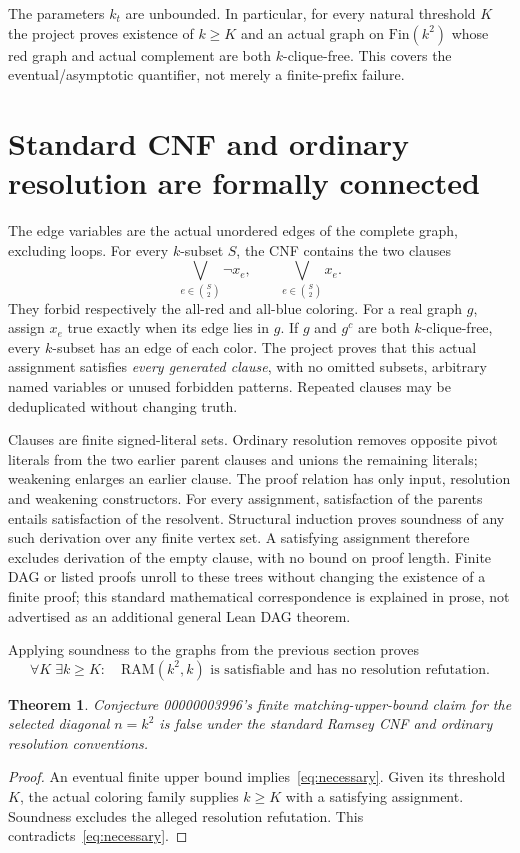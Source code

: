 \documentclass[10pt,a4paper]{article}
\newtheorem{theorem}{Theorem}
\begin{document}
The parameters $k_t$ are unbounded. In particular, for every natural threshold $K$ the
project proves existence of $k\ge K$ and an actual graph on $\mathrm{Fin}(k^2)$ whose red
graph and actual complement are both $k$-clique-free. This covers the eventual/asymptotic
quantifier, not merely a finite-prefix failure.

\section{Standard CNF and ordinary resolution are formally connected}
The edge variables are the actual unordered edges of the complete graph, excluding loops.
For every $k$-subset $S$, the CNF contains the two clauses
\[
 \bigvee_{e\in\binom S2}\neg x_e,\qquad
 \bigvee_{e\in\binom S2}x_e.
\]
They forbid respectively the all-red and all-blue coloring. For a real graph $g$, assign
$x_e$ true exactly when its edge lies in $g$. If $g$ and $g^c$ are both $k$-clique-free,
every $k$-subset has an edge of each color. The project proves that this actual assignment
satisfies \emph{every generated clause}, with no omitted subsets, arbitrary named variables
or unused forbidden patterns. Repeated clauses may be deduplicated without changing truth.

Clauses are finite signed-literal sets. Ordinary resolution removes opposite pivot literals
from the two earlier parent clauses and unions the remaining literals; weakening enlarges
an earlier clause. The proof relation has only input, resolution and weakening constructors.
For every assignment, satisfaction of the parents entails satisfaction of the resolvent.
Structural induction proves soundness of any such derivation over any finite vertex set.
A satisfying assignment therefore excludes derivation of the empty clause, with no bound
on proof length. Finite DAG or listed proofs unroll to these trees without changing the
existence of a finite proof; this standard mathematical correspondence is explained in
prose, not advertised as an additional general Lean DAG theorem.

Applying soundness to the graphs from the previous section proves
\[
 \forall K\;\exists k\ge K:\quad
 \mathrm{RAM}(k^2,k)\text{ is satisfiable and has no resolution refutation}.
\]
\begin{theorem}
Conjecture 00000003996's finite matching-upper-bound claim for the selected diagonal
$n=k^2$ is false under the standard Ramsey CNF and ordinary resolution conventions.
\end{theorem}
\begin{proof}
An eventual finite upper bound implies~\eqref{eq:necessary}. Given its threshold $K$, the
actual coloring family supplies $k\ge K$ with a satisfying assignment. Soundness excludes
the alleged resolution refutation. This contradicts~\eqref{eq:necessary}.
\end{proof}
\end{document}
